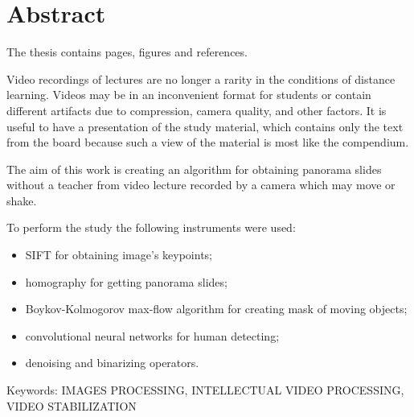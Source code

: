 \chapter*{Abstract}

The thesis contains
\pageref{LastPage}
pages,
figures
and
 references.

Video recordings of lectures are no longer a rarity in
the conditions of distance learning.
Videos may be in an inconvenient format for
students or contain different artifacts due
to compression, camera quality, and other factors.
It is useful to have a presentation of the study material,
which contains only the text from the board
because such a view of the material is most
like the compendium.

The aim of this work
is creating an algorithm for obtaining panorama
slides without a teacher from video lecture
recorded by a camera which may move or shake.

To perform the study the following instruments were used:
\begin{itemize}
  \item
        SIFT for obtaining image's keypoints;
  \item
        homography for getting panorama slides;
  \item
        Boykov-Kolmogorov max-flow algorithm for creating mask of
        moving objects;
  \item
        convolutional neural networks for human detecting;
  \item
        denoising and binarizing operators.
\end{itemize}

Keywords:
\MakeUppercase{images processing, intellectual video
  processing, video stabilization}
